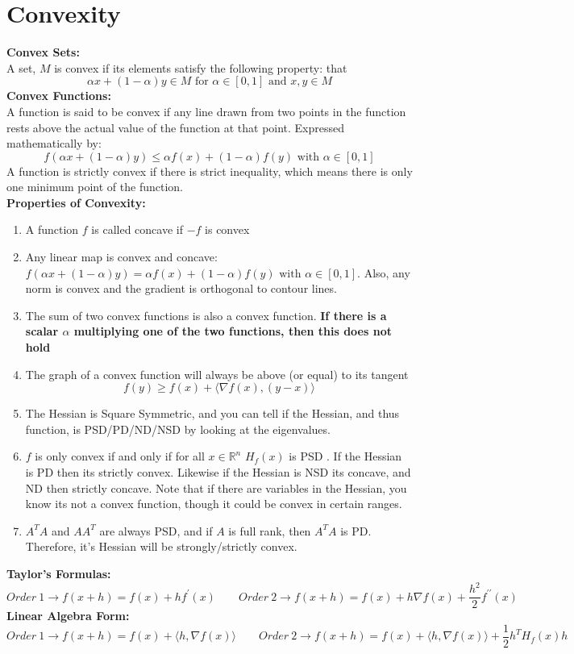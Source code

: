 \documentclass[12pt,twoside]{article}
\newcommand{\R}{\mathbb{R}}
\begin{document}
\section*{Convexity}
\textbf{Convex Sets:}\\
A set, $M$ is convex if its elements satisfy the following property: that 
$$\alpha x + (1-\alpha) y \in M \text{ for } \alpha \in [0,1] \text{ and } x,y \in M$$ 
\textbf{Convex Functions:}\\
A function is said to be convex if any line drawn from two points in the function rests above the actual value of the function at that point. Expressed mathematically by:
$$
    f(\alpha x + (1-\alpha)y) \leq \alpha f(x) + (1-\alpha)f(y) \text{ with } \alpha \in [0,1]
$$
A function is strictly convex if there is strict inequality, which means there is only one minimum point of the function.\\
\textbf{Properties of Convexity:}
\begin{enumerate}
    \item A function $f$ is called concave if $-f$ is convex
    \item Any linear map is convex and concave: $f(\alpha x + (1-\alpha)y) = \alpha f(x) + (1-\alpha)f(y) \text{ with } \alpha \in [0,1]$. Also, any norm is convex and the gradient is orthogonal to contour lines.
    \item The sum of two convex functions is also a convex function. \textbf{If there is a scalar $\alpha$ multiplying one of the two functions, then this does not hold}
    \item The graph of a convex function will always be above (or equal) to its tangent $$
        f(y) \geq f(x) + \langle \nabla f(x), (y-x)\rangle 
    $$
    \item The Hessian is Square Symmetric, and you can tell if the Hessian, and thus function, is PSD/PD/ND/NSD by looking at the eigenvalues.
    \item $f$ is only convex if and only if for all $x\in \R^n$ $H_f(x)$ is PSD . If the Hessian is PD then its strictly convex. Likewise if the Hessian is NSD its concave, and ND then strictly concave. Note that if there are variables in the Hessian, you know its not a convex function, though it could be convex in certain ranges. 
    \item $A^TA$ and $AA^T$ are always PSD, and if $A$ is full rank, then $A^TA$ is PD. Therefore, it's Hessian will be strongly/strictly convex.
    \end{enumerate}
\textbf{Taylor's Formulas:}
$$
    Order \ 1 \rightarrow f(x+h) = f(x) + hf^\prime(x) \qquad  Order \ 2 \rightarrow f(x+h) = f(x) + h\nabla f(x) + \frac{h^2}{2}f^{\prime \prime}(x)
$$
\textbf{Linear Algebra Form:} 
$$
    Order \ 1 \rightarrow f(x+h) = f(x) + \langle h, \nabla f(x) \rangle \qquad  Order \ 2 \rightarrow f(x+h) = f(x) + \langle h, \nabla f(x) \rangle + \frac{1}{2}h^TH_f(x)h
$$
    
\end{document}
